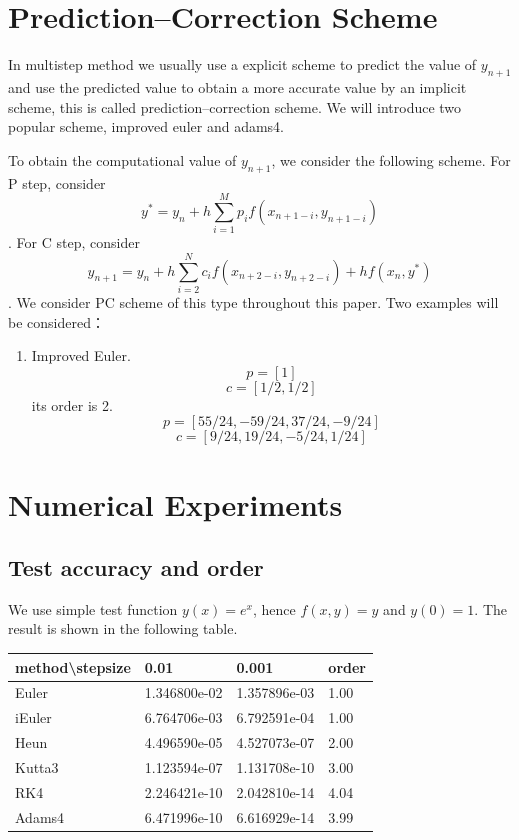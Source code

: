 \documentclass{article}
\begin{document}
\section{Prediction--Correction Scheme}
In multistep method we usually use a explicit scheme to predict the value of $y_{n+1}$ and use the predicted value to obtain a more accurate value by an implicit scheme, this is called prediction--correction scheme.  We will introduce two popular scheme, improved euler and adams4.

To obtain the computational value of $y_{n+1}$, we consider the following scheme.
For P step, consider $$y^* = y_n + h\sum_{i=1}^M p_{i}f(x_{n+1-i}, y_{n+1-i})$$.
For C step, consider $$y_{n+1} = y_n + h\sum_{i=2}^N c_{i}f(x_{n+2-i}, y_{n+2-i}) + hf(x_n, y^*)$$.
We consider PC scheme of this type throughout this paper.  Two examples will be considered：
\begin{enumerate}
	\item Improved Euler. 
	$$p = [1]$$
	$$c = [1/2,1/2]$$
	its order is 2.
	$$p = [55/24, -59/24, 37/24, -9/24]$$
	$$c = [9/24, 19/24, -5/24, 1/24]$$
\end{enumerate}
\section{Numerical Experiments}
\subsection{Test accuracy and order}
We use simple test function $y(x) = e^x$, hence $f(x,y) = y$ and $y(0)=1$.
The result is shown in the following table.
\begin{table}[H]
	\centering
	\begin{tabular}{|l|l|l|l|}
		\hline
		method\textbackslash{}stepsize & 0.01         & 0.001        & order \\ \hline
		Euler                          & 1.346800e-02 & 1.357896e-03 & 1.00  \\ \hline
		iEuler                         & 6.764706e-03 & 6.792591e-04 & 1.00  \\ \hline
		Heun                           & 4.496590e-05 & 4.527073e-07 & 2.00  \\ \hline
		Kutta3                         & 1.123594e-07 & 1.131708e-10 & 3.00  \\ \hline
		RK4                            & 2.246421e-10 & 2.042810e-14 & 4.04  \\ \hline
		Adams4                         & 6.471996e-10 & 6.616929e-14 & 3.99  \\ \hline
	\end{tabular}
\end{table}
\end{document}
